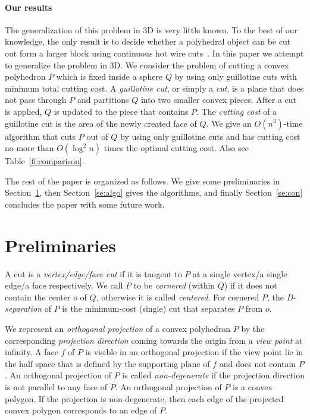 \documentclass{llncs}
\begin{document}
\paragraph{Our results}
The generalization of this problem in 3D is very little known.
To the best of our knowledge, the only result is to decide whether a 
polyhedral object can be cut out form a larger block using continuous hot wire cuts~\cite{JK03}.
In this paper we attempt to generalize the problem in 3D.
We consider the problem of cutting a convex polyhedron $P$ which is 
fixed inside a sphere $Q$ by using only guillotine cuts with minimum total cutting cost.
A \emph{guillotine cut}, or simply a \emph{cut}, is a plane that does not pass through $P$ 
and partitions $Q$ into two smaller convex pieces.
After a cut is applied, $Q$ is updated to the piece that contains $P$.
The \emph{cutting cost} of a guillotine cut is the area of the newly created face of $Q$.
We give an $O(n^3)$-time algorithm that cuts $P$ out of $Q$ by using only guillotine cuts and
has cutting cost no more than $O(\log^2 n)$ times the optimal cutting cost.
Also see Table~\ref{fi:comparison}.


The rest of the paper is organized as follows.
We give some preliminaries in Section~\ref{se:pre}, 
then Section~\ref{se:algo} gives the algorithms, and finally Section~\ref{se:con} concludes the paper 
with some future work.


\section{Preliminaries}
\label{se:pre}
A cut is a \emph{vertex/edge/face cut} if it is tangent to $P$ at a single vertex/a single edge/a face respectively.
We call $P$ to be \emph{cornered} (within $Q$) if it does not contain the center $o$ of $Q$, otherwise it is called \emph{centered}.
For cornered $P$, the \emph{D-separation} of $P$ is the minimum-cost (single) cut that separates $P$ from $o$.



We represent an \emph{orthogonal projection} of a convex polyhedron $P$ by the corresponding 
\emph{projection direction} coming towards the origin from a \emph{view point} at infinity. 
A face $f$ of $P$ is visible in an orthogonal projection if the view point
lie in the half space that is defined by the supporting plane of $f$ and does not contain $P$.
An orthogonal projection of $P$ is called  \emph{non-degenerate}
if the projection direction is not parallel to any face of $P$.
An orthogonal projection of $P$ is a convex polygon.
If the projection is non-degenerate, then each edge of the projected convex polygon corresponds to an edge of $P$. 
\end{document}
